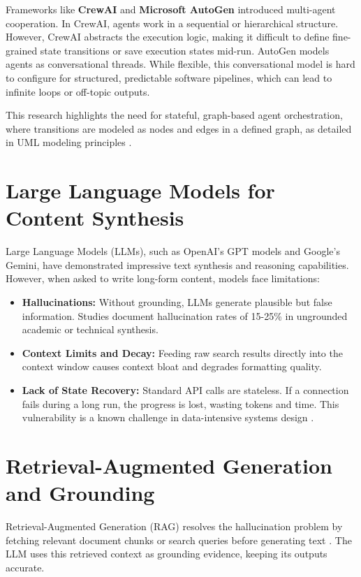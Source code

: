 Frameworks like \textbf{CrewAI} and \textbf{Microsoft AutoGen} \cite{wu2023autogen} introduced multi-agent cooperation. In CrewAI, agents work in a sequential or hierarchical structure. However, CrewAI abstracts the execution logic, making it difficult to define fine-grained state transitions or save execution states mid-run. AutoGen models agents as conversational threads. While flexible, this conversational model is hard to configure for structured, predictable software pipelines, which can lead to infinite loops or off-topic outputs.

This research highlights the need for stateful, graph-based agent orchestration, where transitions are modeled as nodes and edges in a defined graph, as detailed in UML modeling principles \cite{seidl2015uml}.

\section{Large Language Models for Content Synthesis}

Large Language Models (LLMs), such as OpenAI's GPT models and Google's Gemini, have demonstrated impressive text synthesis and reasoning capabilities. However, when asked to write long-form content, models face limitations:
\begin{itemize}
    \item \textbf{Hallucinations:} Without grounding, LLMs generate plausible but false information. Studies document hallucination rates of 15-25\% in ungrounded academic or technical synthesis.
    \item \textbf{Context Limits and Decay:} Feeding raw search results directly into the context window causes context bloat and degrades formatting quality.
    \item \textbf{Lack of State Recovery:} Standard API calls are stateless. If a connection fails during a long run, the progress is lost, wasting tokens and time. This vulnerability is a known challenge in data-intensive systems design \cite{kleppmann2017designing}.
\end{itemize}

\section{Retrieval-Augmented Generation and Grounding}

Retrieval-Augmented Generation (RAG) resolves the hallucination problem by fetching relevant document chunks or search queries before generating text \cite{lewis2020retrieval}. The LLM uses this retrieved context as grounding evidence, keeping its outputs accurate.


